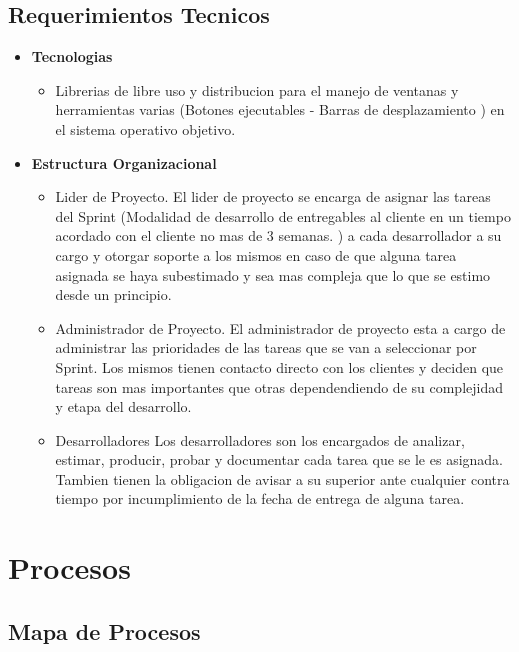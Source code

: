 \documentclass[
10pt, %
a4paper, %
oneside, %
headinclude,footinclude, %
BCOR5mm, %
]{scrartcl}
\begin{document}
\subsection{Requerimientos Tecnicos}
\begin{itemize}
  \item \textbf {Tecnologias}
  \begin{itemize}
    \item Librerias de libre uso y distribucion para el manejo de ventanas
          y herramientas varias (Botones ejecutables - Barras de desplazamiento )
          en el sistema operativo objetivo.
  \end{itemize}

  \item \textbf {Estructura Organizacional}
  \begin{itemize}
    \item Lider de Proyecto.
            El lider de proyecto se encarga de asignar las tareas del
            Sprint (Modalidad de desarrollo de entregables al cliente en un
                     tiempo acordado con el cliente no mas de 3 semanas. )
            a cada desarrollador a su cargo y otorgar soporte a los mismos
            en caso de que alguna tarea asignada se haya subestimado y sea
            mas compleja que lo que se estimo desde un principio.
    \item Administrador de Proyecto.
            El administrador de proyecto esta a cargo de administrar las
            prioridades de las tareas que se van a seleccionar por Sprint.
            Los mismos tienen contacto directo con los clientes y deciden
            que tareas son mas importantes que otras dependendiendo de su
            complejidad y etapa del desarrollo.
    \item Desarrolladores
            Los desarrolladores son los encargados de analizar, estimar,
            producir, probar y documentar cada tarea que se le es asignada.
            Tambien tienen la obligacion de avisar a su superior ante cualquier
            contra tiempo por incumplimiento de la fecha de entrega de alguna tarea.
  \end{itemize}
\end{itemize}

\section{Procesos}

\subsection{Mapa de Procesos}
    
\end{document}
